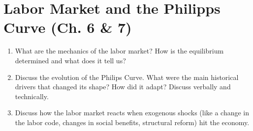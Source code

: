 \documentclass{extarticle}
\begin{document}
\section{Labor Market and the Philipps Curve (Ch. 6 \& 7)}
\begin{enumerate}
    \item What are the mechanics of the labor market? How is the equilibrium determined and what does it tell us?
    \item Discuss the evolution of the Philips Curve. What were the main historical drivers that changed its shape? How did it adapt? Discuss verbally and technically.
    \item Discuss how the labor market reacts when exogenous shocks (like a change in the labor code, changes in social benefits, structural reform) hit the economy.
\end{enumerate}
\end{document}
